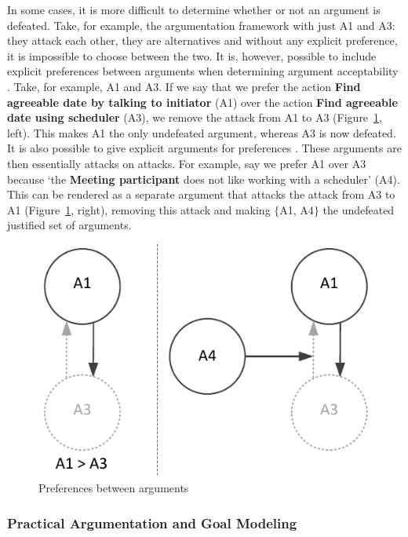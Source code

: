 In some cases, it is more difficult to determine whether or not an argument is defeated. Take, for example, the argumentation framework with just A1 and A3: they attack each other, they are alternatives and without any explicit preference, it is impossible to choose between the two. It is, however, possible to include explicit preferences between arguments when determining argument acceptability \cite{amgoud2002reasoning}. Take, for example, A1 and A3. If we say that we prefer the action \textbf{Find agreeable date by talking to initiator} (A1) over the action \textbf{Find agreeable date using scheduler} (A3), we remove the attack from A1 to A3 (Figure~\ref{fig:pras:example2}, left). This makes A1 the only undefeated argument, whereas A3 is now defeated. It is also possible to give explicit arguments for preferences \cite{modgil2009}. These arguments are then essentially attacks on attacks. For example, say we prefer A1 over A3 because `the \textbf{Meeting participant} does not like working with a scheduler' (A4). This can be rendered as a separate argument that attacks the attack from A3 to A1 (Figure~\ref{fig:pras:example2}, right), removing this attack and making $\{$A1, A4$\}$ the undefeated justified set of arguments.

\begin{figure}[ht]
\centering
\includegraphics[scale=0.8]{img/Fig2}
\caption{Preferences between arguments}
\label{fig:pras:example2}
\end{figure}  

\subsubsection{Practical Argumentation and Goal Modeling}
\label{sect:background:pras:motivation}

